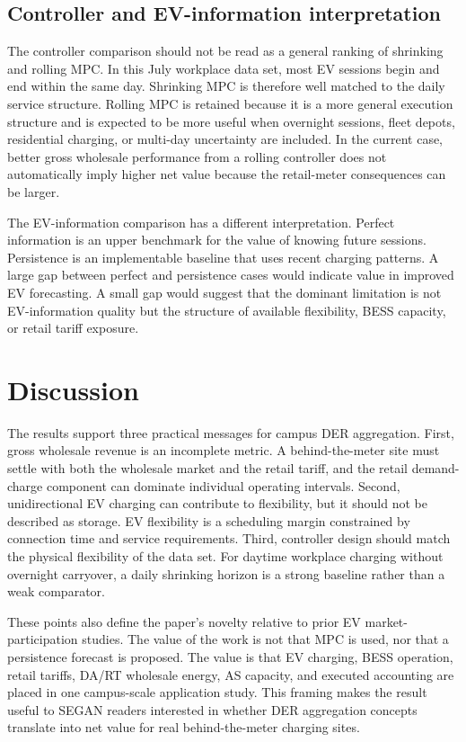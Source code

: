 \documentclass[final,5p,times]{elsarticle}
\begin{document}
\subsection{Controller and EV-information interpretation}
The controller comparison should not be read as a general ranking of shrinking and rolling MPC. In this July workplace data set, most EV sessions begin and end within the same day. Shrinking MPC is therefore well matched to the daily service structure. Rolling MPC is retained because it is a more general execution structure and is expected to be more useful when overnight sessions, fleet depots, residential charging, or multi-day uncertainty are included. In the current case, better gross wholesale performance from a rolling controller does not automatically imply higher net value because the retail-meter consequences can be larger.

The EV-information comparison has a different interpretation. Perfect information is an upper benchmark for the value of knowing future sessions. Persistence is an implementable baseline that uses recent charging patterns. A large gap between perfect and persistence cases would indicate value in improved EV forecasting. A small gap would suggest that the dominant limitation is not EV-information quality but the structure of available flexibility, BESS capacity, or retail tariff exposure.

\section{Discussion}
\label{sec:discussion}

The results support three practical messages for campus DER aggregation. First, gross wholesale revenue is an incomplete metric. A behind-the-meter site must settle with both the wholesale market and the retail tariff, and the retail demand-charge component can dominate individual operating intervals. Second, unidirectional EV charging can contribute to flexibility, but it should not be described as storage. EV flexibility is a scheduling margin constrained by connection time and service requirements. Third, controller design should match the physical flexibility of the data set. For daytime workplace charging without overnight carryover, a daily shrinking horizon is a strong baseline rather than a weak comparator.

These points also define the paper's novelty relative to prior EV market-participation studies. The value of the work is not that MPC is used, nor that a persistence forecast is proposed. The value is that EV charging, BESS operation, retail tariffs, DA/RT wholesale energy, AS capacity, and executed accounting are placed in one campus-scale application study. This framing makes the result useful to SEGAN readers interested in whether DER aggregation concepts translate into net value for real behind-the-meter charging sites.
\end{document}
